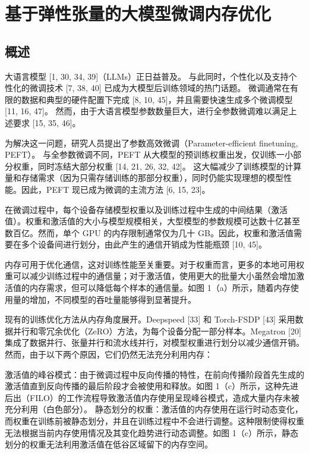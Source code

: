 
\chapter{基于弹性张量的大模型微调内存优化}

\section{概述}

大语言模型 [1, 30, 34, 39]（LLMs）正日益普及。
与此同时，个性化以及支持个性化的微调技术 [7, 38, 40] 已成为大模型后训练领域的热门话题。
微调通常在有限的数据和典型的硬件配置下完成 [8, 10, 45]，并且需要快速生成多个微调模型 [11, 16, 47]。
然而，由于大语言模型参数数量巨大，进行全参数微调难以满足上述要求 [15, 35, 46]。

为解决这一问题，研究人员提出了参数高效微调（Parameter-efficient finetuning, PEFT）。
与全参数微调不同，PEFT 从大模型的预训练权重出发，仅训练一小部分权重，同时冻结大部分权重 [14, 21, 26, 32, 42]。
这大幅减少了训练模型的计算量和存储需求（因为只需存储训练的那部分权重），同时仍能实现理想的模型性能。因此，PEFT 现已成为微调的主流方法 [6, 15, 23]。

在微调过程中，每个设备存储模型权重以及训练过程中生成的中间结果（激活值）。权重和激活值的大小与模型规模相关，大型模型的参数规模可达数十亿甚至数百亿。然而，单个 GPU 的内存限制通常仅为几十 GB。因此，权重和激活值需要在多个设备间进行划分，由此产生的通信开销成为性能瓶颈 [10, 45]。

内存可用于优化通信，这对训练性能至关重要。对于权重而言，更多的本地可用权重可以减少训练过程中的通信量；对于激活值，使用更大的批量大小虽然会增加激活值的内存需求，但可以降低每个样本的通信量。如图 1（a）所示，随着内存使用量的增加，不同模型的吞吐量能够得到显著提升。

现有的训练优化方法从内存角度展开。Deepspeed [33] 和 Torch-FSDP [43] 采用数据并行和零冗余优化（ZeRO）方法，为每个设备分配一部分样本。Megatron [20] 集成了数据并行、张量并行和流水线并行，对模型权重进行划分以减少通信开销。然而，由于以下两个原因，它们仍然无法充分利用内存：

激活值的峰谷模式：由于微调过程中反向传播的特性，在前向传播阶段首先生成的激活值直到反向传播的最后阶段才会被使用和释放。如图 1（c）所示，这种先进后出（FILO）的工作流程导致激活值内存使用呈现峰谷模式，造成大量内存未被充分利用（白色部分）。
静态划分的权重：激活值的内存使用在运行时动态变化，而权重在训练前被静态划分，并且在训练过程中不会进行调整。这种限制使得权重无法根据当前内存使用情况及其变化趋势进行动态调整。如图 1（c）所示，静态划分的权重无法利用激活值在低谷区域留下的内存空间。

